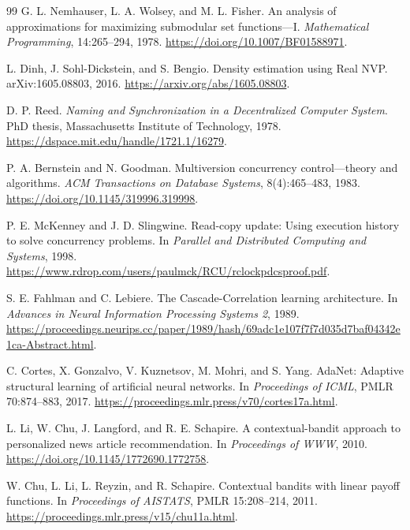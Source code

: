 \documentclass[11pt]{article}
\theoremstyle{definition}
\theoremstyle{plain}
\begin{document}
\begin{thebibliography}{99}
G. L. Nemhauser, L. A. Wolsey, and M. L. Fisher.
\newblock An analysis of approximations for maximizing submodular set
functions---I.
\newblock \emph{Mathematical Programming}, 14:265--294, 1978.
\newblock \url{https://doi.org/10.1007/BF01588971}.

L. Dinh, J. Sohl-Dickstein, and S. Bengio.
\newblock Density estimation using Real NVP.
\newblock arXiv:1605.08803, 2016.
\newblock \url{https://arxiv.org/abs/1605.08803}.

D. P. Reed.
\newblock \emph{Naming and Synchronization in a Decentralized Computer
System}.
\newblock PhD thesis, Massachusetts Institute of Technology, 1978.
\newblock \url{https://dspace.mit.edu/handle/1721.1/16279}.

P. A. Bernstein and N. Goodman.
\newblock Multiversion concurrency control---theory and algorithms.
\newblock \emph{ACM Transactions on Database Systems}, 8(4):465--483, 1983.
\newblock \url{https://doi.org/10.1145/319996.319998}.

P. E. McKenney and J. D. Slingwine.
\newblock Read-copy update: Using execution history to solve concurrency
problems.
\newblock In \emph{Parallel and Distributed Computing and Systems}, 1998.
\newblock \url{https://www.rdrop.com/users/paulmck/RCU/rclockpdcsproof.pdf}.

S. E. Fahlman and C. Lebiere.
\newblock The Cascade-Correlation learning architecture.
\newblock In \emph{Advances in Neural Information Processing Systems 2},
1989.
\newblock \url{https://proceedings.neurips.cc/paper/1989/hash/69adc1e107f7f7d035d7baf04342e1ca-Abstract.html}.

C. Cortes, X. Gonzalvo, V. Kuznetsov, M. Mohri, and S. Yang.
\newblock AdaNet: Adaptive structural learning of artificial neural networks.
\newblock In \emph{Proceedings of ICML}, PMLR 70:874--883, 2017.
\newblock \url{https://proceedings.mlr.press/v70/cortes17a.html}.

L. Li, W. Chu, J. Langford, and R. E. Schapire.
\newblock A contextual-bandit approach to personalized news article
recommendation.
\newblock In \emph{Proceedings of WWW}, 2010.
\newblock \url{https://doi.org/10.1145/1772690.1772758}.

W. Chu, L. Li, L. Reyzin, and R. Schapire.
\newblock Contextual bandits with linear payoff functions.
\newblock In \emph{Proceedings of AISTATS}, PMLR 15:208--214, 2011.
\newblock \url{https://proceedings.mlr.press/v15/chu11a.html}.


\end{thebibliography}
\end{document}
